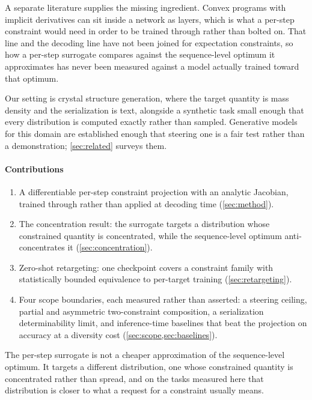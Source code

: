 A separate literature supplies the missing ingredient. Convex programs with implicit
derivatives can sit inside a network as layers, which is what a per-step constraint would
need in order to be trained through rather than bolted on. That
line and the decoding line have not been joined for expectation constraints, so how a
per-step surrogate compares against the sequence-level optimum it approximates has never
been measured against a model actually trained toward that optimum.

Our setting is crystal structure generation, where the target quantity is mass density and
the serialization is text, alongside a synthetic task small enough that every distribution
is computed exactly rather than sampled. Generative models for this domain are established enough that steering one is a fair test
rather than a demonstration; \cref{sec:related} surveys them.

\paragraph{Contributions}

\begin{enumerate}
  \item A differentiable per-step constraint projection with an analytic Jacobian,
        trained through rather than applied at decoding time (\cref{sec:method}).
  \item The concentration result: the surrogate targets a distribution whose
        constrained quantity is concentrated, while the sequence-level optimum
        anti-concentrates it (\cref{sec:concentration}).
  \item Zero-shot retargeting: one checkpoint covers a constraint family with
        statistically bounded equivalence to per-target training
        (\cref{sec:retargeting}).
  \item Four scope boundaries, each measured rather than asserted: a steering
        ceiling, partial and asymmetric two-constraint composition, a serialization
        determinability limit, and inference-time baselines that beat the projection on
        accuracy at a diversity cost (\cref{sec:scope,sec:baselines}).
\end{enumerate}

\begin{kilkey}
The per-step surrogate is not a cheaper approximation of the sequence-level optimum. It
targets a different distribution, one whose constrained quantity is concentrated rather than
spread, and on the tasks measured here that distribution is closer to what a request for a
constraint usually means.
\end{kilkey}

